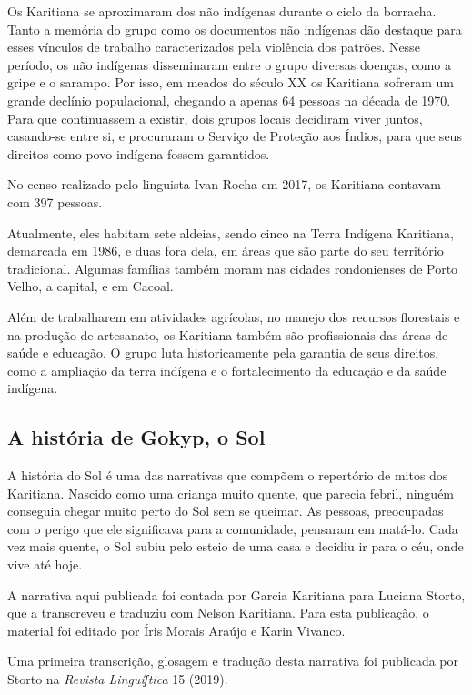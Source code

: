 Os Karitiana se aproximaram dos não indígenas durante o ciclo da
borracha. Tanto a memória do grupo como os documentos não indígenas dão
destaque para esses vínculos de trabalho caracterizados pela violência
dos patrões. Nesse período, os não indígenas disseminaram entre o grupo
diversas doenças, como a gripe e o sarampo. Por isso, em meados do
século XX os Karitiana sofreram um grande declínio populacional,
chegando a apenas 64 pessoas na década de 1970. Para que continuassem a
existir, dois grupos locais decidiram viver juntos, casando-se entre si,
e procuraram o Serviço de Proteção aos Índios, para que seus direitos
como povo indígena fossem garantidos.

No censo realizado pelo linguista Ivan Rocha em 2017, os Karitiana
contavam com 397 pessoas.

Atualmente, eles habitam sete aldeias, sendo cinco na Terra Indígena
Karitiana, demarcada em 1986, e duas fora dela, em áreas que são parte
do seu território tradicional. Algumas famílias também moram nas cidades
rondonienses de Porto Velho, a capital, e em Cacoal.

Além de trabalharem em atividades agrícolas, no manejo dos recursos
florestais e na produção de artesanato, os Karitiana também são
profissionais das áreas de saúde e educação. O grupo luta historicamente
pela garantia de seus direitos, como a ampliação da terra indígena e o
fortalecimento da educação e da saúde indígena.

\subsection{A história de Gokyp, o
Sol}\label{a-histuxf3ria-de-gokyp-o-sol}

A história do Sol é uma das narrativas que compõem o repertório de mitos
dos Karitiana. Nascido como uma criança muito quente, que parecia
febril, ninguém conseguia chegar muito perto do Sol sem se queimar. As
pessoas, preocupadas com o perigo que ele significava para a comunidade,
pensaram em matá-lo. Cada vez mais quente, o Sol subiu pelo esteio de
uma casa e decidiu ir para o céu, onde vive até hoje.

A narrativa aqui publicada foi contada por Garcia Karitiana para Luciana
Storto, que a transcreveu e traduziu com Nelson Karitiana. Para esta
publicação, o material foi editado por Íris Morais Araújo e Karin
Vivanco.

Uma primeira transcrição, glosagem e tradução desta narrativa foi
publicada por Storto na \emph{Revista Linguíʃtica} 15 (2019).

